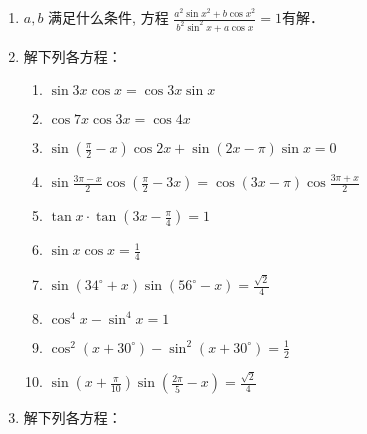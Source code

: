 \begin{enumerate}
\item $a, b$ 满足什么条件, 方程
$
\frac{a^{2} \sin x^{2}+b \cos x^{2}}{b^{2} \sin ^{2} x+a \cos x}=1
$有解．
\item 解下列各方程：
\begin{enumerate}
\item $\sin 3 x \cos x=\cos 3 x \sin x$
\item $\cos 7 x \cos 3 x=\cos 4 x$
\item $\sin \left(\frac{\pi}{2}-x\right) \cos 2 x+\sin (2 x-\pi) \sin x=0$
\item  $\sin \frac{3 \pi-x}{2} \cos \left(\frac{\pi}{2}-3 x\right) =\cos (3 x-\pi) \cos \frac{3 \pi+x}{2}$
\item $\tan x\cdot \tan\left(3x-\frac{\pi}{4}\right)=1$
\item $\sin x\cos x=\frac{1}{4}$
\item $\sin(34^{\circ}+x)\sin(56^{\circ}-x)=\frac{\sqrt{2}}{4}$
\item $\cos^4x-\sin^4x=1$
\item $\cos ^{2}\left(x+30^{\circ}\right)-\sin ^{2}\left(x+30^{\circ}\right)=\frac{1}{2}$
\item $\sin \left(x+\frac{\pi}{10}\right) \sin \left(\frac{2 \pi}{5}-x\right)=\frac{\sqrt{2}}{4}$
\end{enumerate}

\item 解下列各方程：


\end{enumerate}
